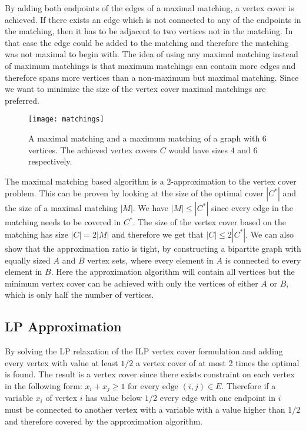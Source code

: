 By adding both endpoints of the edges of a maximal matching, a vertex cover is achieved. If there exists an edge which is not connected to any of the endpoints in the matching, then it has to be adjacent to two vertices not in the matching. In that case the edge could be added to the matching and therefore the matching was not maximal to begin with. The idea of using any maximal matching instead of maximum matchings is that maximum matchings can contain more edges and therefore spans more vertices than a non-maximum but maximal matching. Since we want to minimize the size of the vertex cover maximal matchings are preferred.

\begin{figure}[H]
    \centering
    \texttt{[image: matchings]}
    \caption{A maximal matching and a maximum matching of a graph with 6 vertices. The achieved vertex covers $C$ would have sizes $4$ and $6$ respectively.}
\end{figure}

The maximal matching based algorithm is a 2-approximation to the vertex cover problem. This can be proven by looking at the size of the optimal cover $|C^*|$ and the size of a maximal matching $|M|$. We have $|M| \leq |C^*|$ since every edge in the matching needs to be covered in $C^*$. The size of the vertex cover based on the matching has size $|C| = 2|M|$ and therefore we get that $|C| \leq 2|C^*|$. We can also show that the approximation ratio is tight, by constructing a bipartite graph with equally sized $A$ and $B$ vertex sets, where every element in $A$ is connected to every element in $B$. Here the approximation algorithm will contain all vertices but the minimum vertex cover can be achieved with only the vertices of either $A$ or $B$, which is only half the number of vertices.

\subsection{LP Approximation}
By solving the LP relaxation of the ILP vertex cover formulation and adding every vertex with value at least $1/2$ a vertex cover of at most 2 times the optimal is found. The result is a vertex cover since there exists constraint on each vertex in the following form: $x_i + x_j \ge 1 \text{ for every edge } (i,j) \in E$. Therefore if a variable $x_i$ of vertex $i$ has value below $1/2$ every edge with one endpoint in $i$ must be connected to another vertex with a variable with a value higher than $1/2$ and therefore covered by the approximation algorithm.

